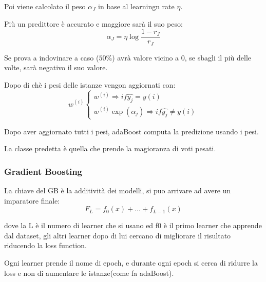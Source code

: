 Poi viene calcolato il peso $\alpha_J$ in base al learningn rate $\eta$.

Più un predittore è accurato e maggiore sarà il suo peso:
\begin{equation}
    \alpha_J = \eta\log\frac{1-r_J}{r_J}
\end{equation}

Se prova a indovinare a caso ($50\%$) avrà valore vicino a 0, se sbagli il più
delle volte, sarà negativo il suo valore.


Dopo di chè i pesi delle istanze vengon aggiornati con:
\begin{equation}
    w^{(i)}
    \begin{cases}
        w^{(i)} \Rightarrow if \hat{y_j}=y(i) \\
        w^{(i)} \exp(\alpha_j) \Rightarrow if \hat{y_j}\neq y(i)
    \end{cases}
\end{equation}

Dopo aver aggiornato tutti i pesi, adaBoost computa la predizione usando i pesi.

La classe predetta è quella che prende la magioranza di voti pesati.

\subsubsection{Gradient Boosting}
La chiave del GB è la additività dei modelli, si puo arrivare ad avere
un imparatore finale:
\begin{equation*}
    F_L=f_0(x) + \dots + f_{L-1}(x)
\end{equation*}

dove la L è il numero di learner che si usano ed f0 è il primo learner che apprende
dal dataset, gli altri learner dopo di lui cercano di migliorare il risultato
riducendo la loss function.

Ogni learner prende il nome di epoch, e durante ogni epoch si cerca di ridurre la
loss e non di aumentare le istanze(come fa adaBoost).



































